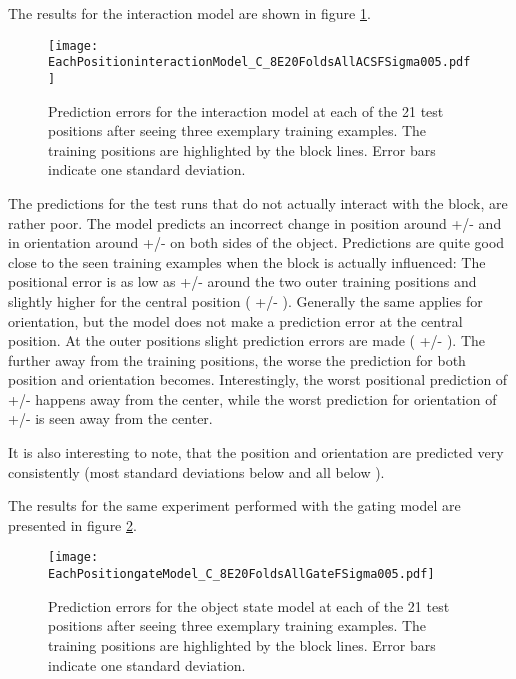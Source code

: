 The results for the interaction model are shown in figure \ref{fig:eachPosInteraction}.

\begin{figure}
\centering
\texttt{[image: EachPositioninteractionModel\_C\_8E20FoldsAllACSFSigma005.pdf]}
\caption{Prediction errors for the interaction model at each of the 21 test positions after seeing three exemplary training examples. The training positions are highlighted by the block lines. Error bars indicate one standard deviation.}
\label{fig:eachPosInteraction}
\end{figure}

The predictions for the test runs that do not actually interact with the block, are rather poor. The model predicts an incorrect change in position around  +/-  and in orientation around  +/-  on both sides of the object. 
Predictions are quite good close to the seen training examples when the block is actually influenced: The positional error is as low as  +/-  around the two outer training positions and slightly higher for the central position ( +/- ). Generally the same applies for orientation, but the model does not make a prediction error at the central position. At the outer positions slight prediction errors are made ( +/- ).
The further away from the training positions, the worse the prediction for both position and orientation becomes. Interestingly, the worst positional prediction of  +/-   happens  away from the center, while the worst prediction for orientation of  +/-  is seen  away from the center.

It is also interesting to note, that the position and orientation are predicted very consistently (most standard deviations below  and all below ).

The results for the same experiment performed with the gating model are presented in figure \ref{fig:eachPosGate}.

\begin{figure}
\centering
\texttt{[image: EachPositiongateModel\_C\_8E20FoldsAllGateFSigma005.pdf]}
\caption{Prediction errors for the object state model at each of the 21 test positions after seeing three exemplary training examples. The training positions are highlighted by the block lines. Error bars indicate one standard deviation.}
\label{fig:eachPosGate}
\end{figure}

